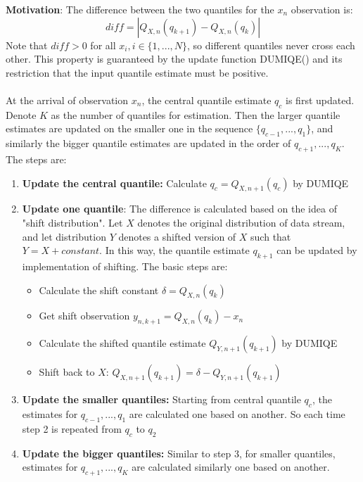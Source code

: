 \textbf{Motivation}: The difference between the two quantiles for the $x_{n}$ observation is:
$$
diff = |Q_{X,n}(q_{k+1}) - Q_{X,n}(q_k)|
$$
Note that $diff > 0$ for all $x_i, i \in \{1,...,N\}$, so different quantiles never cross each other. This property is guaranteed by the update function DUMIQE() and its restriction that the input quantile estimate must be positive.
\\\\
At the arrival of observation $x_n$, the central quantile estimate $q_c$ is first updated. Denote $K$ as the number of quantiles for estimation. Then the larger quantile estimates are updated on the smaller one in the sequence $\{q_{c-1}, ..., q_1\}$, and similarly the bigger quantile estimates are updated in the order of {$q_{c+1}, ..., q_{K}$}. The steps are:
\begin{enumerate}
    \item \textbf{Update the central quantile:} Calculate $q_c = Q_{X,n+1}(q_c)$ by DUMIQE
    \item  \textbf{Update one quantile}: The difference is calculated based on the idea of "shift distribution". Let $X$ denotes the original distribution of data stream, and let distribution $Y$ denotes a shifted version of $X$ such that $Y = X + constant$. In this way, the quantile estimate $q_{k+1}$ can be updated by implementation of shifting. The basic steps are:
        \begin{itemize}
            \item Calculate the shift constant $\delta = Q_{X,n}(q_k)$
            \item Get shift observation $y_{n,k+1} =  Q_{X,n}(q_k) - x_n$
            \item Calculate the shifted quantile estimate $Q_{Y, n+1}(q_{k+1})$ by DUMIQE
            \item Shift back to $X$: $Q_{X,n+1}(q_{k+1}) =  \delta  - Q_{Y, n+1}(q_{k+1})$
        \end{itemize}
    \item \textbf{Update the smaller quantiles:} Starting from central quantile $q_c$, the estimates for $q_{c-1}, ..., q_{1}$ are calculated one based on another. So each time step 2 is repeated from $q_c$ to $q_{2}$
    \item  \textbf{Update the bigger quantiles:} Similar to step 3, for smaller quantiles, estimates for $q_{c+1}, ..., q_{K}$ are calculated similarly one based on another.
\end{enumerate}

